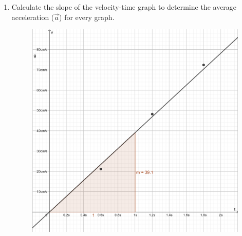 \documentclass[12pt]{article}
\begin{document}
\begin{enumerate}
\begin{figure}[H]
\begin{minipage}{0.4\textwidth}
        \end{minipage}
    \end{figure}
    \item Calculate the slope of the velocity-time graph to determine the average acceleration ($\vec{a}$) for every graph.
    \begin{figure}[H]
        \centering
        \begin{minipage}{0.4\textwidth}
            \centering
            \includegraphics[scale=1.25]{LabReportImg/5TB-TangentSlope.png}
        \end{minipage}
        \begin{minipage}{0.4\textwidth}
            \centering

\end{minipage}
\end{figure}
\end{enumerate}
\end{document}
